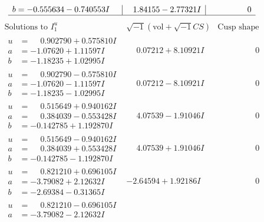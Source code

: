 \documentclass[1p]{elsarticle_modified}
\theoremstyle{definition}
\newcommand{\I}{\sqrt{-1}}
\begin{document}
$$\begin{array}{c|c|c}
\begin{aligned}
b &= -0.555634 - 0.740553 I\end{aligned}
 & \phantom{-}1.84155 - 2.77321 I & \phantom{-0.000000 } 0\\
 \hline 
 \end{array}$$\newpage$$\begin{array}{c|c|c}  
\text{Solutions to }I^u_{1}& \I (\text{vol} + \sqrt{-1}CS) & \text{Cusp shape}\\
 \hline 
\begin{aligned}
u &= \phantom{-}0.902790 + 0.575810 I \\
a &= -1.07620 + 1.11597 I \\
b &= -1.18235 + 1.02995 I\end{aligned}
 & \phantom{-}0.07212 + 8.10921 I & \phantom{-0.000000 } 0 \\ \hline\begin{aligned}
u &= \phantom{-}0.902790 - 0.575810 I \\
a &= -1.07620 - 1.11597 I \\
b &= -1.18235 - 1.02995 I\end{aligned}
 & \phantom{-}0.07212 - 8.10921 I & \phantom{-0.000000 } 0 \\ \hline\begin{aligned}
u &= \phantom{-}0.515649 + 0.940162 I \\
a &= \phantom{-}0.384039 - 0.553428 I \\
b &= -0.142785 + 1.192870 I\end{aligned}
 & \phantom{-}4.07539 - 1.91046 I & \phantom{-0.000000 } 0 \\ \hline\begin{aligned}
u &= \phantom{-}0.515649 - 0.940162 I \\
a &= \phantom{-}0.384039 + 0.553428 I \\
b &= -0.142785 - 1.192870 I\end{aligned}
 & \phantom{-}4.07539 + 1.91046 I & \phantom{-0.000000 } 0 \\ \hline\begin{aligned}
u &= \phantom{-}0.821210 + 0.696105 I \\
a &= -3.79082 + 2.12632 I \\
b &= -2.69384 - 0.31365 I\end{aligned}
 & -2.64594 + 1.92186 I & \phantom{-0.000000 } 0 \\ \hline\begin{aligned}
u &= \phantom{-}0.821210 - 0.696105 I \\
a &= -3.79082 - 2.12632 I \\

\end{aligned}
\end{array}$$
\end{document}
